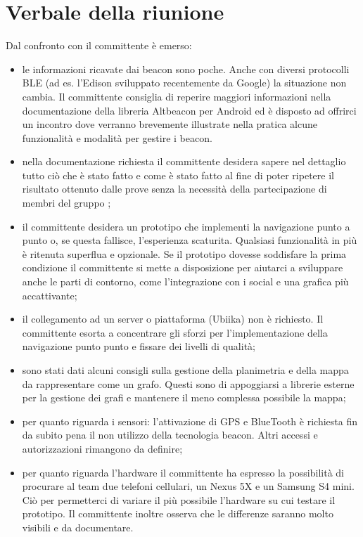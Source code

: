 \documentclass[../Riunione16-01-13.tex]{subfiles}
\begin{document}
\section{Verbale della riunione}

Dal confronto con il committente è emerso:
\begin{itemize}
	\item le informazioni ricavate dai beacon sono poche. Anche con diversi protocolli BLE (ad es. l'Edison sviluppato recentemente da Google) la situazione non cambia. Il committente consiglia di reperire maggiori informazioni nella documentazione della libreria Altbeacon per Android ed è disposto ad offrirci un incontro dove verranno brevemente illustrate nella pratica alcune funzionalità e modalità per gestire i beacon.
	\item nella documentazione richiesta il committente desidera sapere nel dettaglio tutto ciò che è stato fatto e come è stato fatto al fine di poter ripetere il risultato ottenuto dalle prove senza la necessità della partecipazione di membri del gruppo \leaf ;
	\item il committente desidera un prototipo che implementi la navigazione punto a punto o, se questa fallisce, l'esperienza scaturita. Qualsiasi funzionalità in più è ritenuta superflua e opzionale. Se il prototipo dovesse soddisfare la prima condizione il committente si mette a disposizione per aiutarci a sviluppare anche le parti di contorno, come l'integrazione con i social e una grafica più accattivante;
	\item il collegamento ad un server o piattaforma (Ubiika) non è richiesto. Il committente esorta a concentrare gli sforzi per l'implementazione della navigazione punto punto e fissare dei livelli di qualità;
	\item sono stati dati alcuni consigli sulla gestione della planimetria e della mappa da rappresentare come un grafo. Questi sono di appoggiarsi a librerie esterne per la gestione dei grafi e mantenere il meno complessa possibile la mappa;
	\item per quanto riguarda i sensori: l'attivazione di GPS e BlueTooth è richiesta fin da subito pena il non utilizzo della tecnologia beacon. Altri accessi e autorizzazioni rimangono da definire;
	\item per quanto riguarda l'hardware il committente ha espresso la possibilità di procurare al team due telefoni cellulari, un Nexus 5X e un Samsung S4 mini. Ciò per permetterci di variare il più possibile l'hardware su cui testare il prototipo. Il committente inoltre osserva che le differenze saranno molto visibili e da documentare.
\end{itemize}
\end{document}
